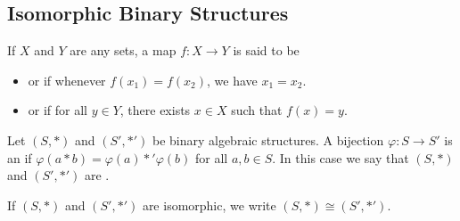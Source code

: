 \documentclass[11pt,fleqn,dvipsnames,usenames]{article}
\begin{document}
\subsection{Isomorphic Binary Structures}

\recall If $X$ and $Y$ are any sets, a map $f:X\to Y$ is said to be
\begin{itemize}
\item {} or  if whenever $f(x_{1}) = f(x_{2})$, we have $x_{1} = x_{2}$.
\item {} or  if for all $y\in Y$, there exists $x\in X$ such that $f(x) = y$.
\end{itemize}
%
\begin{definition}
Let $(S,*)$ and $(S',*')$ be binary algebraic structures.  A bijection $\varphi:S\to S'$ is an  if $\varphi(a*b) = \varphi(a)*'\varphi(b)$ for all $a,b\in S$.  In this case we say that $(S,*)$ and $(S',*')$ are .
\end{definition}
\vsp

\notation If $(S,*)$ and $(S',*')$ are isomorphic, we write $(S,*)\cong(S',*')$.
\vsp
\end{document}

